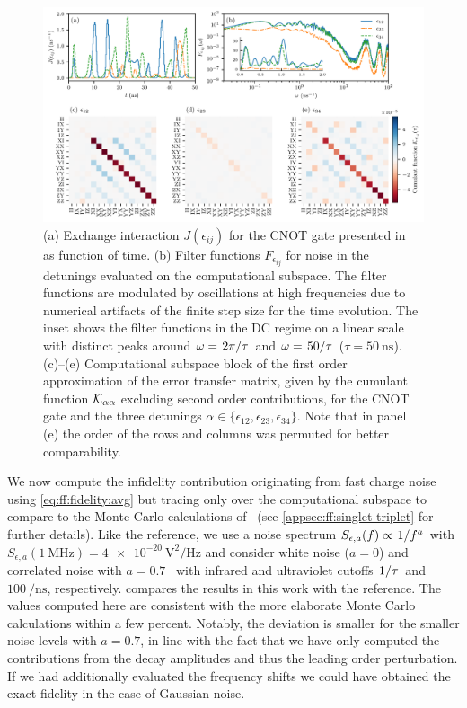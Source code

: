 \begin{figure}[tbp]
    \centering
    \includegraphics[width=\textwidth]{img/pdf/all_in_one_alpha-0-7_linear_complete_CNOT.pdf}
    \caption{
        (a) Exchange interaction $J(\epsilon_{ij})$ for the CNOT gate presented in~ as function of time.
        (b) Filter functions $F_{\epsilon_{ij}}$ for noise in the detunings evaluated on the computational subspace.
        The filter functions are modulated by oscillations at high frequencies due to numerical artifacts of the finite step size for the time evolution.
        The inset shows the filter functions in the DC regime on a linear scale with distinct peaks around $\omega = \flatfrac{2\pi}{\tau}$ and $\omega = \flatfrac{50}{\tau}$ ($\tau = \qty{50}{\nano\second}$).
        (c)--(e) Computational subspace block of the first order approximation of the error transfer matrix, given by the cumulant function $\mathcal{K}_{\alpha\alpha}$ excluding second order contributions, for the CNOT gate and the three detunings $\alpha\in\lbrace\epsilon_{12},\epsilon_{23},\epsilon_{34}\rbrace$.
        Note that in panel (e) the order of the rows and columns was permuted for better comparability.
    }
    \label{fig:ff:CNOT}
\end{figure}

We now compute the infidelity contribution originating from fast charge noise using \cref{eq:ff:fidelity:avg} but tracing only over the computational subspace to compare to the Monte Carlo calculations of~ (see \cref{appsec:ff:singlet-triplet} for further details).
Like the reference, we use a noise spectrum $S_{\epsilon,a}(f)\propto \flatfrac{1}{f^a}$ with $S_{\epsilon,a}(\qty{1}{\MHz}) = \qty{4e-20}{\volt\squared\per\Hz}$ and consider white noise ($a = 0$) and correlated noise with $a = 0.7$~\cite{Dial2013} with infrared and ultraviolet cutoffs $\flatfrac{1}{\tau}$ and $\qty{100}{\per\nano\second}$, respectively.
 compares the results in this work with the reference.
The values computed here are consistent with the more elaborate Monte Carlo calculations within a few percent.
Notably, the deviation is smaller for the smaller noise levels with $a = \num{0.7}$, in line with the fact that we have only computed the contributions from the decay amplitudes \decayamps and thus the leading order perturbation.
If we had additionally evaluated the frequency shifts \freqshifts we could have obtained the exact fidelity in the case of Gaussian noise.


